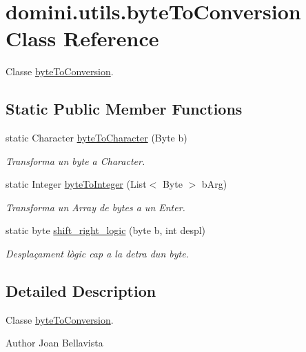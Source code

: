 \hypertarget{classdomini_1_1utils_1_1byteToConversion}{}\section{domini.\+utils.\+byte\+To\+Conversion Class Reference}
\label{classdomini_1_1utils_1_1byteToConversion}


Classe \hyperlink{classdomini_1_1utils_1_1byteToConversion}{byte\+To\+Conversion}.  


\subsection*{Static Public Member Functions}
\begin{DoxyCompactItemize}
\item 
static Character \hyperlink{classdomini_1_1utils_1_1byteToConversion_a5d2f5f8de52e4001cf6698ca03fe31e8}{byte\+To\+Character} (Byte b)
\begin{DoxyCompactList}\small\item\em Transforma un byte a Character. \end{DoxyCompactList}\item 
static Integer \hyperlink{classdomini_1_1utils_1_1byteToConversion_a3242a47adade49b6cfa6a9232944f587}{byte\+To\+Integer} (List$<$ Byte $>$ b\+Arg)
\begin{DoxyCompactList}\small\item\em Transforma un Array de bytes a un Enter. \end{DoxyCompactList}\item 
static byte \hyperlink{classdomini_1_1utils_1_1byteToConversion_a0e232cb9d272ccc13accda58bab9f8e1}{shift\+\_\+right\+\_\+logic} (byte b, int despl)
\begin{DoxyCompactList}\small\item\em Desplaçament lògic cap a la detra d\textquotesingle{}un byte. \end{DoxyCompactList}\end{DoxyCompactItemize}


\subsection{Detailed Description}
Classe \hyperlink{classdomini_1_1utils_1_1byteToConversion}{byte\+To\+Conversion}. 

\begin{DoxyAuthor}{Author}
Joan Bellavista 
\end{DoxyAuthor}


